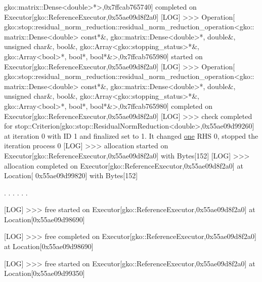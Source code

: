 \begin{DoxyCode}
      gko::matrix::Dense<double>*>,0x7ffcab765740] completed on Executor[gko::ReferenceExecutor,0x55ae09d8f2a0]
[LOG] >>> Operation[
      gko::stop::residual\_norm\_reduction::residual\_norm\_reduction\_operation<gko::matrix::Dense<double> \textcolor{keyword}{const}*&, gko::matrix::Dense<double>*, \textcolor{keywordtype}{double}&, \textcolor{keywordtype}{unsigned} \textcolor{keywordtype}{char}&, \textcolor{keywordtype}{bool}&, 
      gko::Array<gko::stopping\_status>*&, gko::Array<bool>*, \textcolor{keywordtype}{bool}*, \textcolor{keywordtype}{bool}*&>,0x7ffcab765980]
 started on Executor[gko::ReferenceExecutor,0x55ae09d8f2a0]
[LOG] >>> Operation[
      gko::stop::residual\_norm\_reduction::residual\_norm\_reduction\_operation<gko::matrix::Dense<double> \textcolor{keyword}{const}*&, gko::matrix::Dense<double>*, \textcolor{keywordtype}{double}&, \textcolor{keywordtype}{unsigned} \textcolor{keywordtype}{char}&, \textcolor{keywordtype}{bool}&, 
      gko::Array<gko::stopping\_status>*&, gko::Array<bool>*, \textcolor{keywordtype}{bool}*, \textcolor{keywordtype}{bool}*&>,0x7ffcab765980]
 completed on Executor[gko::ReferenceExecutor,0x55ae09d8f2a0]
[LOG] >>> check completed \textcolor{keywordflow}{for} stop::Criterion[gko::stop::ResidualNormReduction<double>,0x55ae09d99260] at 
      iteration 0 with ID 1 and finalized \textcolor{keyword}{set} to 1. It changed \hyperlink{namespacegko_a0059e27f8f4bc348ff65c1e60caf47c8}{one} RHS 0, stopped the iteration process 0
[LOG] >>> allocation started on Executor[gko::ReferenceExecutor,0x55ae09d8f2a0] with Bytes[152]
[LOG] >>> allocation completed on Executor[gko::ReferenceExecutor,0x55ae09d8f2a0] at Location[
      0x55ae09d99820] with Bytes[152]

.
.
.
.
.
.

[LOG] >>> free started on Executor[gko::ReferenceExecutor,0x55ae09d8f2a0] at Location[0x55ae09d98690]      
                                                                                                                  
                                                               
[LOG] >>> free completed on Executor[gko::ReferenceExecutor,0x55ae09d8f2a0] at Location[0x55ae09d98690]    
                                                                                                                  
                                                               
[LOG] >>> free started on Executor[gko::ReferenceExecutor,0x55ae09d8f2a0] at Location[0x55ae09d99350]      
                                                                                                                  

\end{DoxyCode}
